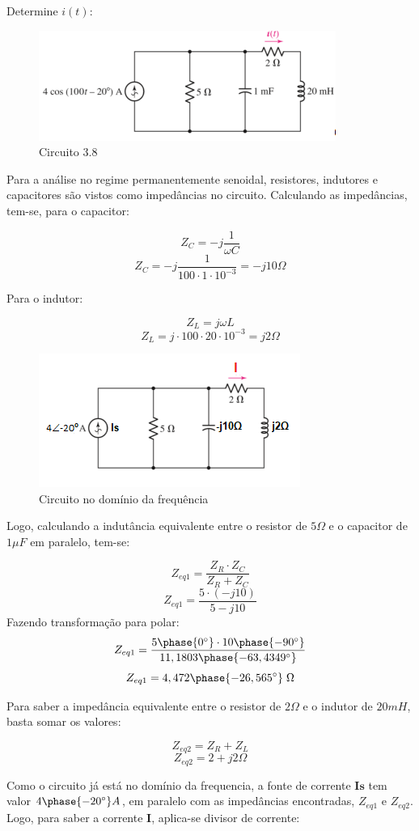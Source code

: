 \documentclass[
	12pt,				%
	oneside,			%
	a4paper,			%
	english,			%
	french,				%
	spanish,			%
	brazil				%
	]{abntex2}
\begin{document}
Determine $i(t)$:

\begin{figure}[htb]
	\centering
	\includegraphics[scale=1]{8.PNG}
	\caption{Circuito 3.8}
\end{figure}

Para a análise no regime permanentemente senoidal, resistores, indutores e capacitores são vistos como impedâncias no circuito. Calculando as impedâncias, tem-se, para o capacitor:

$$Z_C = -j\dfrac{1}{\omega C}$$
$$Z_C = -j\dfrac{1}{100\cdot1\cdot10^{-3}} = -j10 \Omega$$

Para o indutor:

$$Z_L = j\omega L$$
$$Z_L = j\cdot100\cdot20\cdot10^{-3} = j2 \Omega$$
\begin{figure}[htb]
	\centering
	\includegraphics[scale=1]{8-2.PNG}
	\caption{Circuito no domínio da frequência}
\end{figure}

\newpage
Logo, calculando a indutância equivalente entre o resistor de $5\Omega$ e o capacitor de $1\mu F$ em paralelo, tem-se:

$$Z_{eq1} = \dfrac{Z_R\cdot Z_C}{Z_R + Z_C}$$
$$Z_{eq1} = \dfrac{5\cdot (-j10)}{5 - j10}$$
Fazendo transformação para polar:
$$Z_{eq1} = \dfrac{5\phase{0^{\circ}} \cdot 10\phase{-90^{\circ}}}{11,1803\phase{-63,4349^{\circ}}}$$
$$Z_{eq1} = 4,472\phase{-26,565^{\circ}}\;\Omega$$

Para saber a impedância equivalente entre o resistor de $2\Omega$ e o indutor de $20mH$, basta somar os valores:

$$Z_{eq2} = Z_R + Z_L$$
$$Z_{eq2} = 2 + j2 \Omega$$

Como o circuito já está no domínio da frequencia, a fonte de corrente $\textbf{Is}$ tem valor $4\phase{-20^{\circ}} A$, em paralelo com as impedâncias encontradas, $Z_{eq1}$ e $Z_{eq2}$. Logo, para saber a corrente $\textbf{I}$, aplica-se divisor de corrente:
\end{document}
